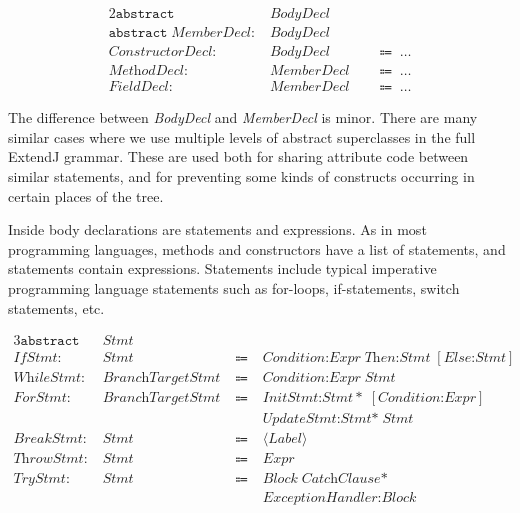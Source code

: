 \documentclass[10pt, twoside, openright]{book}
\begin{document}
\begin{alignat*}{2}
\texttt{abstract} & \; \textit{BodyDecl} & & \\
\texttt{abstract} \; \textit{MemberDecl} : & \; \textit{BodyDecl} & & \\
\textit{ConstructorDecl} : & \; \textit{BodyDecl}  & & \; \Coloneqq \; \ldots \\
\textit{MethodDecl} : & \; \textit{MemberDecl}  & & \; \Coloneqq \; \ldots \\
\textit{FieldDecl} : & \; \textit{MemberDecl}  & & \; \Coloneqq \; \ldots
\end{alignat*}

\noindent
The difference between \emph{BodyDecl} and \emph{MemberDecl} is minor.
There are many similar cases where we use multiple levels of abstract superclasses in the
full ExtendJ grammar. These are used both for sharing attribute code between similar statements, and
for preventing some kinds of constructs occurring in certain places of the tree.

Inside body declarations are statements and expressions. As in most programming languages, methods
and constructors have a list of statements, and statements contain expressions.
Statements include typical imperative programming language statements such as for-loops,
if-statements, switch statements, etc.

\begin{alignat*}{3}
\texttt{abstract} & \; \textit{Stmt} & &  \\
\textit{IfStmt} : & \; \textit{Stmt} & \; \Coloneqq & \; \textit{Condition:Expr}\;\textit{Then:Stmt}\;[\textit{Else:Stmt}] \\
\textit{WhileStmt} : & \; \textit{BranchTargetStmt} & \; \Coloneqq & \; \textit{Condition:Expr}\;\textit{Stmt} \\
\textit{ForStmt} : & \; \textit{BranchTargetStmt} & \; \Coloneqq & \; \textit{InitStmt:Stmt}\ast\;[\textit{Condition:Expr}] \\
& & & \;\textit{UpdateStmt:Stmt}\ast\;\textit{Stmt} \\
\textit{BreakStmt} : & \; \textit{Stmt} & \; \Coloneqq & \; \langle{}\textit{Label}\rangle \\
\textit{ThrowStmt} : & \; \textit{Stmt} & \; \Coloneqq & \; \textit{Expr} \\
\textit{TryStmt} :  & \; \textit{Stmt} & \; \Coloneqq & \; \textit{Block}\;\textit{CatchClause}\ast \\
& & & \;\textit{ExceptionHandler:Block}
\end{alignat*}
\end{document}
